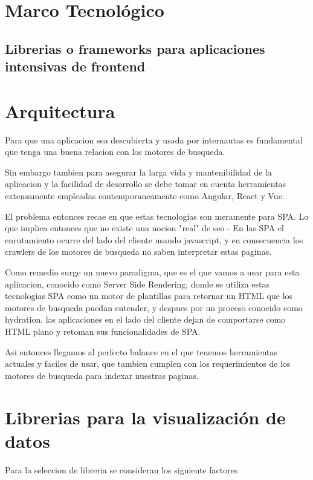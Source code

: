 \section{Marco Tecnológico}



\subsection{Librerias o frameworks para aplicaciones intensivas de frontend }

\section{Arquitectura}

Para que una aplicacion sea descubierta y usada por internautas es fundamental que tenga una buena relacion con los motores de busqueda.

Sin embargo tambien para asegurar la larga vida y mantenibilidad de la aplicacion y la facilidad de desarrollo se debe tomar en cuenta herramientas extensamente empleadas contemporaneamente como Angular, React y Vue.

El problema entonces recae en que estas tecnologías son meramente para SPA. Lo que implica entonces que no existe una nocion "real" de seo - En las SPA el enrutamiento ocurre del lado del cliente usando javascript, y en consecuencia los crawlers de los motores de busqueda no saben interpretar estas paginas.

Como remedio surge un nuevo paradigma, que es el que vamos a usar para esta aplicacion, conocido como Server Side Rendering; donde se utiliza estas tecnologias SPA como un motor de plantillas para retornar un HTML que los motores de busqueda puedan entender, y despues por un proceso conocido como hydration, las aplicaciones en el lado del cliente dejan de comportarse como HTML plano y retoman sus funcionalidades de SPA.

Asi entonces llegamos al perfecto balance en el que tenemos herramientas actuales y faciles de usar, que tambien cumplen con los requerimientos de los motores de busqueda para indexar nuestras paginas.

\section{Librerias para la visualización de datos}

Para la seleccion de libreria se consideran los siguiente factores

